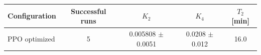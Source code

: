 \begin{tabular}{lcccc}
\toprule
Configuration & Successful runs & $K_2$ & $K_4$ & $T_2$ [min] \\
\midrule
PPO optimized & 5 & 0.005808 $\pm$ 0.0051 & 0.0208 $\pm$ 0.012 & 16.0 \\
\bottomrule
\end{tabular}
